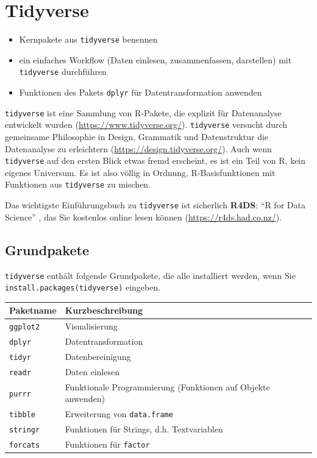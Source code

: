 \documentclass[]{book}
\providecommand{\tightlist}{%
  \setlength{\itemsep}{0pt}\setlength{\parskip}{0pt}}
\newenvironment{rmdoutcomes}{
  \definecolor{outcomes}{rgb}{1.0, 0.92, 0.8}  %
  \color{black}
  \begin{mdframed}[backgroundcolor = outcomes]}
 {\end{mdframed}}
\begin{document}
\hypertarget{tidyverse}{%
\chapter{Tidyverse}\label{tidyverse}}

\begin{rmdoutcomes}
\begin{itemize}
\tightlist
\item
  Kernpakete aus \texttt{tidyverse} benennen
\item
  ein einfaches Workflow (Daten einlesen, zusammenfassen, darstellen)
  mit \texttt{tidyverse} durchführen
\item
  Funktionen des Pakets \texttt{dplyr} für Datentransformation anwenden
\end{itemize}
\end{rmdoutcomes}

\texttt{tidyverse} ist eine Sammlung von R-Pakete, die explizit für Datenanalyse entwickelt wurden (\url{https://www.tidyverse.org/}). \texttt{tidyverse} versucht durch gemeinsame Philosophie in Design, Grammatik und Datenstruktur die Datenanalyse zu erleichtern (\url{https://design.tidyverse.org/}). Auch wenn \texttt{tidyverse} auf den ersten Blick etwas fremd erscheint, es ist ein Teil von R, kein eigenes Universum. Es ist also völlig in Ordnung, R-Basisfunktionen mit Funktionen aus \texttt{tidyverse} zu mischen.

Das wichtigste Einführungsbuch zu \texttt{tidyverse} ist sicherlich \textbf{R4DS}: ``R for Data Science'' \citep{Wickham2017}, das Sie kostenlos online lesen können (\url{https://r4ds.had.co.nz/}).

\hypertarget{grundpakete}{%
\section{Grundpakete}\label{grundpakete}}

\texttt{tidyverse} enthält folgende Grundpakete, die alle installiert werden, wenn Sie \texttt{install.packages(\textquotesingle{}tidyverse\textquotesingle{})} eingeben.

\begin{longtable}[]{@{}ll@{}}
\toprule
Paketname & Kurzbeschreibung\tabularnewline
\midrule
\endhead
\texttt{ggplot2} & Visualisierung\tabularnewline
\texttt{dplyr} & Datentransformation\tabularnewline
\texttt{tidyr} & Datenbereinigung\tabularnewline
\texttt{readr} & Daten einlesen\tabularnewline
\texttt{purrr} & Funktionale Programmierung (Funktionen auf Objekte anwenden)\tabularnewline
\texttt{tibble} & Erweiterung von \texttt{data.frame}\tabularnewline
\texttt{stringr} & Funktionen für Strings, d.h. Textvariablen\tabularnewline
\texttt{forcats} & Funktionen für \texttt{factor}\tabularnewline
\bottomrule
\end{longtable}
\end{document}
